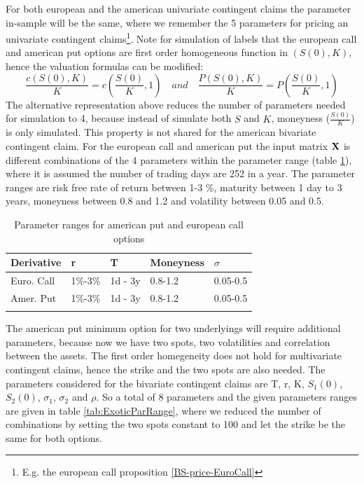 For both european and the american univariate contingent claims the parameter in-sample will be the same, where we remember the 5 parameters for pricing an  univariate contingent claims\footnote{E.g. the european call proposition \ref{BS-price-EuroCall}}. Note for simulation of labels that the european call and american put options are first order homogeneous function in $(S(0),K)$, hence the valuation formulas can be modified:
$$\frac{c(S(0),K)}{K}=c(\frac{S(0)}{K},1) \quad and \quad \frac{P(S(0),K)}{K}=P(\frac{S(0)}{K},1)$$
The alternative representation above reduces the number of parameters needed for simulation to 4, because instead of simulate both $S$ and $K$, moneyness ($\frac{S(0)}{K}$) is only  simulated. This property is not shared for the american bivariate contingent claim. For the european call and american put the input matrix $\mathbf{X}$ is different combinations of the 4 parameters within the parameter range (table \ref{tab:vanillaParRange}), where it is assumed the number of trading days are 252 in a year. The parameter ranges are risk free rate of return between 1-3 \%, maturity between 1 day to 3 years, moneyness between 0.8 and 1.2 and volatility between 0.05 and 0.5. \\

\begin{table}[th]
\caption[Parameter Ranges For MLPs]{Parameter ranges for american put and european call options}
\label{tab:vanillaParRange}
\centering
\begin{tabular}{l l l l l}
\toprule
\textbf{Derivative} & \textbf{r} & \textbf{T} & \textbf{Moneyness} & $\sigma$ \\
\midrule
Euro. Call & 1\%-3\% & 1d - 3y & 0.8-1.2 & 0.05-0.5\\ 
Amer. Put & 1\%-3\% & 1d - 3y & 0.8-1.2 & 0.05-0.5\\ 
\bottomrule\\
\end{tabular}
\end{table}

The american put minimum option for two underlyings will require additional parameters, because now we have two spots, two volatilities and correlation between the assets. The first order homegeneity does not hold for multivariate contingent claims, hence the strike and the two spots are also needed. The parameters considered for the bivariate contingent claims are T, r, K, $S_1(0)$, $S_2(0)$, $\sigma_1$, $\sigma_2$ and $\rho$. So a total of 8 parameters and the given parameters ranges are given in table \ref{tab:ExoticParRange}, where we reduced the number of combinations by setting the two spots constant to 100 and let the strike be the same for both options.\\
   
